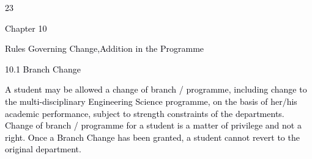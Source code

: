 \documentclass[12pt]{article}
\begin{document}
\vspace{\baselineskip}

\vspace{\baselineskip}

\vspace{\baselineskip}

\vspace{\baselineskip}

\vspace{\baselineskip}

\vspace{\baselineskip}
\begin{adjustwidth}{0.0in}{-0.07in}
\begin{Center}
\textcolor[HTML]{00000A}{23}
\end{Center}\par

\end{adjustwidth}


\vspace{\baselineskip}
{\fontsize{14pt}{16.8pt}\selectfont \textcolor[HTML]{00000A}{Chapter 10}\par}\par


\vspace{\baselineskip}
{\fontsize{20pt}{24.0pt}\selectfont \textcolor[HTML]{00000A}{Rules Governing Change,Addition in the Programme}\par}\par


\vspace{\baselineskip}
\textcolor[HTML]{00000A}{10.1 Branch Change}\par


\vspace{\baselineskip}
\begin{justify}
{\fontsize{10pt}{12.0pt}\selectfont \textcolor[HTML]{00000A}{A student may be allowed a change of branch / programme, including change to the multi-disciplinary Engineering Science programme, on the basis of her/his academic performance, subject to strength constraints of the departments. Change of branch / programme for a student is a matter of privilege and not a right. Once a Branch Change has been granted, a student cannot revert to the original department.}\par}
\end{justify}\par


\vspace{\baselineskip}
\end{document}
